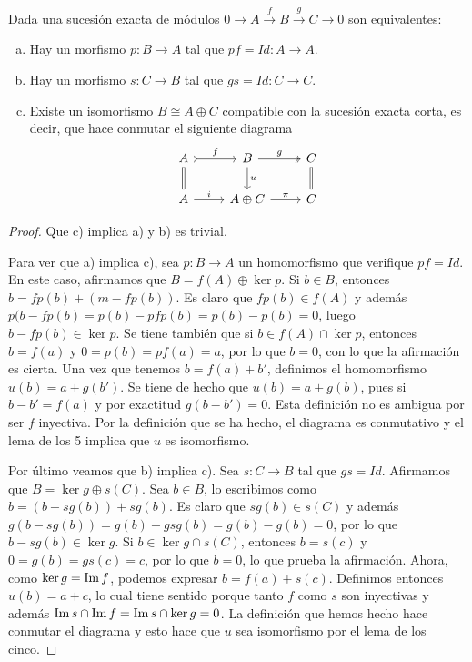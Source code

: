 \documentclass[TA.tex]{subfiles}
\begin{document}
\begin{lemma}
Dada una sucesión exacta de módulos $0\to A\xrightarrow{f}B\xrightarrow{g}C\to 0$ son equivalentes:
\begin{enumerate}[a)]
\item Hay un morfismo $p:B\to A$ tal que $pf=Id:A\to A$.
\item Hay un morfismo $s:C\to B$ tal que $gs=Id:C\to C$. 
\item Existe un isomorfismo $B\cong A\oplus C$ compatible con la sucesión exacta corta, es decir, que hace conmutar el siguiente diagrama
\[
\begin{tikzcd}
A\arrow[r, rightarrowtail, "f"]\arrow[d, equals] & B\arrow[r, twoheadrightarrow, "g"]\arrow[d, "u"] & C\arrow[d, equals] \\
A\arrow[r, "i"] & A\oplus C\arrow[r, "\pi"]& C
\end{tikzcd}
\]
\end{enumerate}
\end{lemma}
\begin{proof}
Que c) implica a) y b) es trivial.

Para ver que a) implica c), sea $p:B\to A$ un homomorfismo que verifique $pf=Id$. En este caso, afirmamos que $B=f(A)\oplus\ker p$. Si $b\in B$, entonces $b=fp(b)+(m-fp(b))$. Es claro que $fp(b)\in f(A)$ y además $p(b-fp(b)=p(b)-pfp(b)=p(b)-p(b)=0$, luego $b-fp(b)\in\ker p$. Se tiene también que si $b\in f(A)\cap\ker p$, entonces $b=f(a)$ y $0=p(b)=pf(a)=a$, por lo que $b=0$, con lo que la afirmación es cierta. Una vez que tenemos $b=f(a)+b'$, definimos el homomorfismo $u(b)=a+g(b')$. Se tiene de hecho que $u(b)=a+g(b)$, pues si $b-b'=f(a)$ y por exactitud $g(b-b')=0$. Esta definición no es ambigua por ser $f$ inyectiva. Por la definición que se ha hecho, el diagrama es conmutativo y el lema de los 5 implica que $u$ es isomorfismo.

Por último veamos que b) implica c). Sea $s:C\to B$ tal que $gs=Id$. Afirmamos que $B=\ker g\oplus s(C)$. Sea $b\in B$, lo escribimos como $b=(b-sg(b))+sg(b)$. Es claro que $sg(b)\in s(C)$ y además $g(b-sg(b))=g(b)-gsg(b)=g(b)-g(b)=0$, por lo que $b-sg(b)\in\ker g$. Si $b\in\ker g\cap s(C)$, entonces $b=s(c)$ y $0=g(b)=gs(c)=c$, por lo que $b=0$, lo que prueba la afirmación. Ahora, como $\ker g=\operatorname{Im} f$, podemos expresar $b=f(a)+s(c)$. Definimos entonces $u(b)=a+c$, lo cual tiene sentido porque tanto $f$ como $s$ son inyectivas y además $\operatorname{Im} s\cap\operatorname{Im} f=\operatorname{Im} s\cap\ker g=0$. La definición que hemos hecho hace conmutar el diagrama y esto hace que $u$ sea isomorfismo por el lema de los cinco. 
\end{proof}
\end{document}
